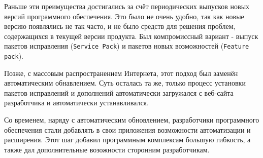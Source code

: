 Раньше эти преимущества достигались за счёт периодических выпусков новых версий программного обеспечения. Это было не очень удобно, так как новые версию появлялись не так часто, и не было средств для решения проблем, содержащихся в текущей версии продукта. Был компромиссный вариант - выпуск пакетов исправления ({\tt Service Pack}) и пакетов новых возможностей ({\tt Feature pack}). 

Позже, с массовым распространением Интернета, этот подход был заменён автоматическим обнавлением. Суть осталась та же, только процесс установки пакетов исправлений и дополнений автоматически загружался с веб-сайта разработчика и автоматически устанавливался. 

Со временем, наряду с автоматическим обновлением, разработчики программного обеспечения стали добавлять в свои приложения возможности автоматизации и расширения. Этот шаг добавил программным комплексам большую гибкость, а также дал дополнительные возожности сторонним разработчикам. 

\pagebreak